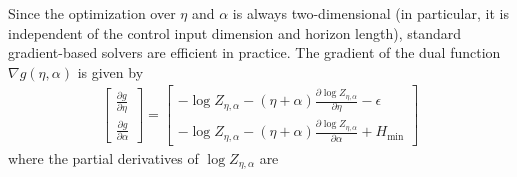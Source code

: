 Since the optimization over $\eta$ and $\alpha$ is always two-dimensional (in particular, it is independent of the control input dimension and horizon length), standard gradient-based solvers are efficient in practice.
The gradient of the dual function $\nabla g(\eta,\alpha)$ is given by
\begin{align}
    \label{eq:tr_dual:gradient}
    \begin{bmatrix}
        \frac{\partial g}{\partial \eta}
        \\
        \frac{\partial g}{\partial \alpha}
    \end{bmatrix}
    =
    \begin{bmatrix}
        -\log Z_{\eta,\alpha}
        -(\eta+\alpha)\frac{\partial \log Z_{\eta,\alpha}}{\partial \eta}
        -\epsilon
        \\
        -\log Z_{\eta,\alpha}
        -(\eta+\alpha)\frac{\partial \log Z_{\eta,\alpha}}{\partial \alpha}
        +H_{\min}
    \end{bmatrix}
\end{align}
where the partial derivatives of $\log Z_{\eta,\alpha}$ are
